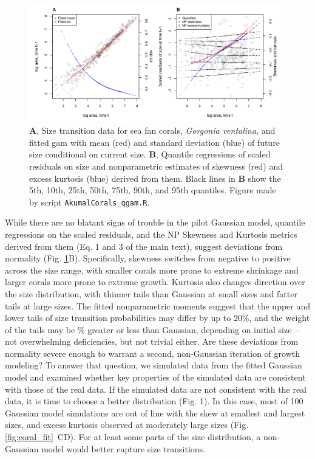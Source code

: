 \documentclass[12pt]{article}
\begin{document}
\begin{spacing}{1.35}
	
	\begin{figure}[tbp]
		\centering
		\includegraphics[width=1.0\textwidth]{figures/coral_qgam_diagnostics.pdf}
		\caption{\textbf{A}, Size transition data for sea fan corals, \emph{Gorgonia ventalina}, and fitted gam with mean (red) and standard deviation (blue) of future size conditional on current size.  \textbf{B}, Quantile regressions of scaled residuals on size and nonparametric estimates of skewness (red) and excess kurtosis (blue) derived from them. Black lines in \textbf{B} show the 5th, 10th, 25th, 50th, 75th, 90th, and 95th quantiles. Figure made by script \texttt{AkumalCorals\_qgam.R}.}
		\label{fig:coral_diagnostics}
	\end{figure} 
	
	While there are no blatant signs of trouble in the pilot Gaussian model, quantile regressions on the scaled residuals, and the NP Skewness and Kurtosis metrics derived from them (Eq. 1 and 3 of the main text), suggest deviations from normality (Fig. \ref{fig:coral_diagnostics}B).
	Specifically, skewness switches from negative to positive across the size range, with smaller corals more prone to extreme shrinkage and larger corals more prone to extreme growth.  
	Kurtosis also changes direction over the size distribution, with thinner tails than Gaussian at small sizes and fatter tails at large sizes. 
	The fitted nonparametric moments suggest that the upper and lower tails of size transition probabilities may differ by up to 20\%, and the weight of the tails may be \% greater or less than Gaussian, depending on initial size -- not overwhelming deficiencies, but not trivial either. 
	Are these deviations from normality severe enough to warrant a second, non-Gaussian iteration of growth modeling? 
	To answer that question, we simulated data from the fitted Gaussian model and examined whether key properties of the simulated data are consistent with those of the real data. 
	If the simulated data are not consistent with the real data, it is time to choose a better distribution (Fig. 1). 
	In this case, most of 100 Gaussian model simulations are out of line with the skew at smallest and largest sizes, and excess kurtosis observed at moderately large sizes (Fig. \ref{fig:coral_fit}~CD). For at least some parts of the size distribution, a non-Gaussian model would better capture size transitions. 
	

\end{spacing}
\end{document}
